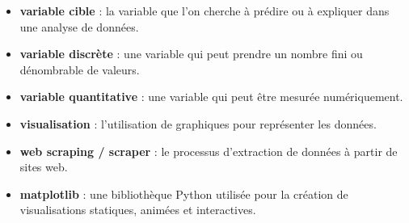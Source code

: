 \begin{itemize}
	\item \textbf{variable cible} : la variable que l'on cherche à prédire ou à expliquer dans une analyse de données.
	\item \textbf{variable discrète} : une variable qui peut prendre un nombre fini ou dénombrable de valeurs.
	\item \textbf{variable quantitative} : une variable qui peut être mesurée numériquement.
	\item \textbf{visualisation} : l'utilisation de graphiques pour représenter les données.
	\item \textbf{web scraping / scraper} : le processus d'extraction de données à partir de sites web.
	\item \textbf{matplotlib} : une bibliothèque Python utilisée pour la création de visualisations statiques, animées et interactives.
\end{itemize}
